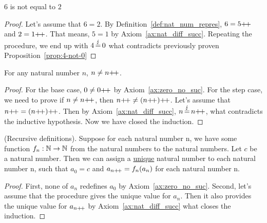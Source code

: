 \begin{proposition}
    $6$ is not equal to $2$
\end{proposition}
\begin{proof}
    Let's assume that $6=2$. By Definition~\ref{def:nat_num_repres}, $6=5\operatorname{\!+\!+}$ and $2=1\operatorname{\!+\!+}$. That means, $5=1$ by Axiom~\ref{ax:nat_diff_succ}. 
    Repeating the procedure, we end up with $4\operatorname{\stackrel{\lightning}{=}}0$ what contradicts previously proven Proposition~\ref{prop:4-not-0}
\end{proof}
\begin{subsequence}
    \begin{lemma}
        For any natural number $n$, $n\neq n\operatorname{\!+\!+}$.\label{lem:n!=n++}
    \end{lemma}
\end{subsequence}
\begin{proof}
    For the base case, $0\neq 0\operatorname{\!+\!+}$ by Axiom~\ref{ax:zero_no_suc}. For the step case, we need to prove if $n\neq n\operatorname{\!+\!+}$, then $n\operatorname{\!+\!+}\neq (n\operatorname{\!+\!+})\operatorname{\!+\!+}$. Let's assume that $n\operatorname{\!+\!+} = (n\operatorname{\!+\!+})\operatorname{\!+\!+}$. Then by Axiom~\ref{ax:nat_diff_succ}, $n\operatorname{\stackrel{\lightning}{=}} n\operatorname{\!+\!+}$, what contradicts the inductive hypothesis. Now we have closed the induction.
\end{proof}

\begin{proposition}
    (Recursive definitions). Suppose for each
    natural number n, we have some function $f_n: \mathbb{N} \to \mathbb{N}$ from
    the natural numbers to the natural numbers. Let $c$ be a natural
    number. Then we can assign a \underline{unique} natural number to each
    natural number n, such that $a_0 = c$ and $a_{n\operatorname{\!+\!+}} = f_n(a_n)$ for each
    natural number n.
\end{proposition}

\begin{proof}
    First, none of $a_n$ redefines $a_0$ by Axiom~\ref{ax:zero_no_suc}. 
    Second, let's assume that the procedure gives the unique value for $a_n$. 
    Then it also provides the unique value for $a_{n\operatorname{\!+\!+}}$ by Axiom~\ref{ax:nat_diff_succ}
    what closes the induction. 
\end{proof}
\pagebreak